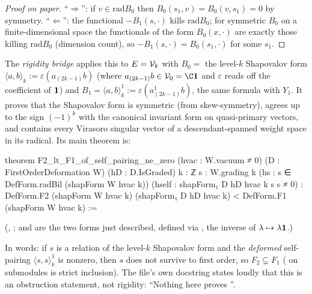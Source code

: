 \begin{proof}[Proof on paper]
``$\Rightarrow$'': if $v\in\mathrm{rad}B_0$ then $B_0(s_1,v) = B_0(v,s_1) = 0$ by symmetry. ``$\Leftarrow$'': the
functional $-B_1(s,\cdot)$ kills $\mathrm{rad}B_0$; for symmetric $B_0$ on a finite-dimensional space the
functionals of the form $B_0(x,\cdot)$ are exactly those killing $\mathrm{rad}B_0$ (dimension count), so
$-B_1(s,\cdot) = B_0(s_1,\cdot)$ for some $s_1$.
\end{proof}

The \emph{rigidity bridge} applies this to $E = \mathcal{V}_k$ with $B_0 = $ the level-$k$ Shapovalov form
$\langle a,b\rangle_k := \varepsilon(a_{(2k-1)}b)$ (where $a_{(2k-1)}b\in\lsevenV_0 = \C\lsevenvac$ and $\varepsilon$ reads off
the coefficient of $\mathbf{1}$) and $B_1 = \langle a,b\rangle^1_k := \varepsilon(a^1_{(2k-1)}b)$, the same formula
with $Y_1$. It proves that the Shapovalov form is symmetric (from skew-symmetry), agrees up to the sign
$(-1)^k$ with the canonical invariant form on quasi-primary vectors, and contains every Virasoro
singular vector of a descendant-spanned weight space in its radical. Its main theorem is:

\begin{leancode}
theorem F2_lt_F1_of_self_pairing_ne_zero (hvac : W.vacuum ≠ 0)
    (D : FirstOrderDeformation W) (hD : D.IsGraded) {k : ℤ} {s : W.grading k}
    (hs : s ∈ DefForm.radBil (shapForm W hvac k))
    (hself : shapForm₁ D hD hvac k s s ≠ 0) :
    DefForm.F2 (shapForm W hvac k) (shapForm₁ D hD hvac k) < DefForm.F1 (shapForm W hvac k) :=
\end{leancode}
(, ;
 and  are the two forms just described, defined
via , the inverse of $\lambda\mapsto\lambda\mathbf{1}$.)

\begin{dictionary}
In words: if $s$ is a relation of the level-$k$ Shapovalov form and the \emph{deformed} self-pairing
$\langle s,s\rangle^1_k$ is nonzero, then $s$ does not survive to first order, so $F_2\subsetneq F_1$ (\lean{<} on
submodules is strict inclusion). The file's own docstring states loudly that this is an obstruction
statement, not rigidity: ``Nothing here proves ''.
\end{dictionary}

